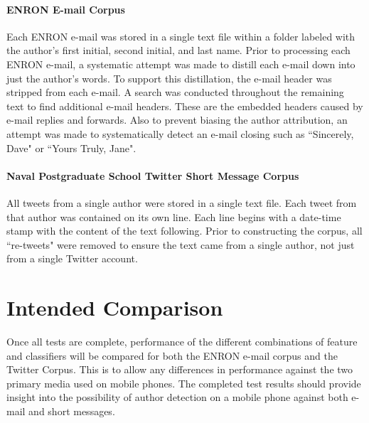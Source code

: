 	\paragraph{ENRON E-mail Corpus} Each ENRON e-mail was stored in a single text file within a folder labeled with the author's first initial, second initial, and last name.  Prior to processing each ENRON e-mail, a systematic attempt was made to distill each e-mail down into just the author's words.  To support this distillation, the e-mail header was stripped from each e-mail.  A search was conducted throughout the remaining text to find additional e-mail headers.  These are the embedded headers caused by e-mail replies and forwards.  Also to prevent biasing the author attribution, an attempt was made to systematically detect an e-mail closing such as ``Sincerely, Dave" or ``Yours Truly, Jane".
	\paragraph{Naval Postgraduate School Twitter Short Message Corpus} All tweets from a single author were stored in a single text file.  Each tweet from that author was contained on its own line.  Each line begins with a date-time stamp with the content of the text following.  Prior to constructing the corpus, all ``re-tweets" were removed to ensure the text came from a single author, not just from a single Twitter account.
	
\section{Intended Comparison}  Once all tests are complete, performance of the different combinations of feature and classifiers will be compared for both the ENRON e-mail corpus and the Twitter Corpus.  This is to allow any differences in performance against the two primary media used on mobile phones.  The completed test results should provide insight into the possibility of author detection on a mobile phone against both e-mail and short messages.




